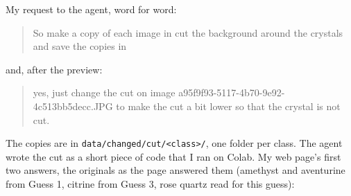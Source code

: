 \documentclass[11pt]{article}
\begin{document}
My request to the agent, word for word:
\begin{quote}
So make a copy of each image in  cut the background around the
crystals and save the copies in 
\end{quote}
and, after the preview:
\begin{quote}
yes, just change the cut on image a95f9f93-5117-4b70-9e92-4c513bb5decc.JPG to
make the cut a bit lower so that the crystal is not cut.
\end{quote}
The copies are in \texttt{data/changed/cut/<class>/}, one folder per class.
The agent wrote the cut as a short piece of code that I ran on Colab. My web
page's first two answers, the originals as the page answered them (amethyst and aventurine from
Guess 1, citrine from Guess 3, rose quartz read for this guess):
\end{document}
